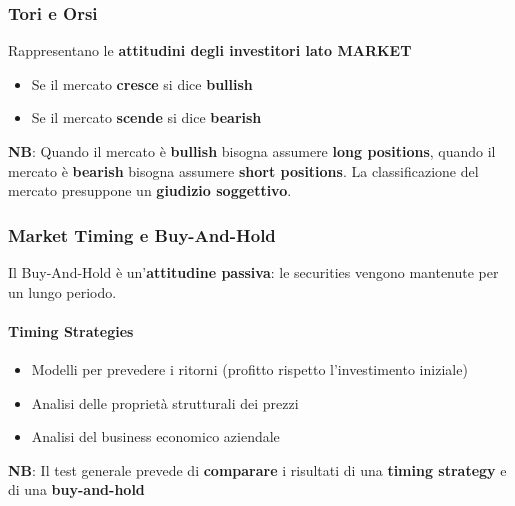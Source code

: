 \documentclass[12pt]{article}
\begin{document}
\subsubsection{Tori e Orsi}
Rappresentano le \textbf{attitudini degli investitori lato MARKET}
\begin{itemize}
    \item Se il mercato \textbf{cresce} si dice \textbf{bullish}
    \item Se il mercato \textbf{scende} si dice \textbf{bearish}
\end{itemize}
\textbf{NB}: Quando il mercato è \textbf{bullish} bisogna assumere \textbf{long positions}, quando il mercato è \textbf{bearish} bisogna assumere \textbf{short positions}.
La classificazione del mercato presuppone un \textbf{giudizio soggettivo}.
\subsubsection{Market Timing e Buy-And-Hold}
Il Buy-And-Hold è un'\textbf{attitudine passiva}: le securities vengono mantenute per un lungo periodo.
\paragraph{Timing Strategies}
\begin{itemize}
    \item Modelli per prevedere i ritorni (profitto rispetto l'investimento iniziale)
    \item Analisi delle proprietà strutturali dei prezzi
    \item Analisi del business economico aziendale
\end{itemize}
\textbf{NB}: Il test generale prevede di \textbf{comparare} i risultati di una \textbf{timing strategy} e di una \textbf{buy-and-hold}
\end{document}
